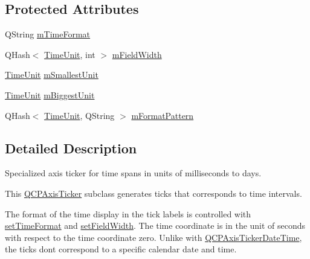 \subsection*{Protected Attributes}
\begin{DoxyCompactItemize}
\item 
Q\+String \mbox{\hyperlink{class_q_c_p_axis_ticker_time_a800af3fe0a7c1a8110c043b82169bc9d}{m\+Time\+Format}}
\item 
Q\+Hash$<$ \mbox{\hyperlink{class_q_c_p_axis_ticker_time_a5c48ded8c6d3a1aca9b68219469fea3e}{Time\+Unit}}, int $>$ \mbox{\hyperlink{class_q_c_p_axis_ticker_time_a58305b56f847bcab8b3c852a21bdb91a}{m\+Field\+Width}}
\item 
\mbox{\hyperlink{class_q_c_p_axis_ticker_time_a5c48ded8c6d3a1aca9b68219469fea3e}{Time\+Unit}} \mbox{\hyperlink{class_q_c_p_axis_ticker_time_a61033c493cec76a69628d1aaa5b07abf}{m\+Smallest\+Unit}}
\item 
\mbox{\hyperlink{class_q_c_p_axis_ticker_time_a5c48ded8c6d3a1aca9b68219469fea3e}{Time\+Unit}} \mbox{\hyperlink{class_q_c_p_axis_ticker_time_a349b2debe07adc591996aa73dec9a757}{m\+Biggest\+Unit}}
\item 
Q\+Hash$<$ \mbox{\hyperlink{class_q_c_p_axis_ticker_time_a5c48ded8c6d3a1aca9b68219469fea3e}{Time\+Unit}}, Q\+String $>$ \mbox{\hyperlink{class_q_c_p_axis_ticker_time_adfc8221afbccb99343aa61f75419908d}{m\+Format\+Pattern}}
\end{DoxyCompactItemize}


\subsection{Detailed Description}
Specialized axis ticker for time spans in units of milliseconds to days. 



This \mbox{\hyperlink{class_q_c_p_axis_ticker}{Q\+C\+P\+Axis\+Ticker}} subclass generates ticks that corresponds to time intervals.

The format of the time display in the tick labels is controlled with \mbox{\hyperlink{class_q_c_p_axis_ticker_time_a2f30b6e5125bce4256be9ce3177088ea}{set\+Time\+Format}} and \mbox{\hyperlink{class_q_c_p_axis_ticker_time_adc13e54fc969be98a5c0e3fa0dbaa293}{set\+Field\+Width}}. The time coordinate is in the unit of seconds with respect to the time coordinate zero. Unlike with \mbox{\hyperlink{class_q_c_p_axis_ticker_date_time}{Q\+C\+P\+Axis\+Ticker\+Date\+Time}}, the ticks don\textquotesingle{}t correspond to a specific calendar date and time.

